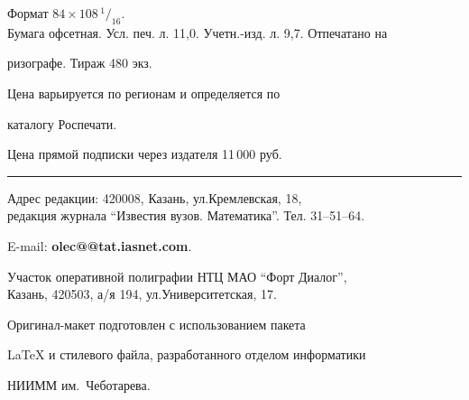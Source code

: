 Формат $84\times 108 \,^1/_{16}.$\\


Бумага офсетная. Усл. печ. л. 11,0. Учетн.-изд. л. 9,7. Отпечатано на 


ризографе. Тираж 480 экз. 





\noindent Цена варьируется по регионам и определяется по 


каталогу Роспечати. 





\noindent Цена прямой подписки через издателя  11\,000  руб. 


\bigskip


\hrule


\bigskip


\noindent Адрес редакции: 420008, Казань, ул.Кремлевская, 18,\\  


редакция журнала  ``Известия вузов. Математика''. Тел. 31--51--64.





\noindent E-mail: {\bf olec@@tat.iasnet.com}. \par


\bigskip 


\noindent Участок оперативной полиграфии НТЦ МАО  ``Форт Диалог'', \\


Казань, 420503, а/я 194, ул.Университетская, 17. \par


\bigskip


\noindent Оригинал-макет подготовлен с использованием пакета


\AmS\LaTeX{} и стилевого файла, разработанного отделом информатики


НИИММ им.~Чеботарева.








